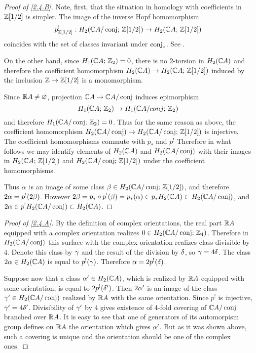 \documentclass{article}
\numberwithin{equation}{section}
\begin{document}
\begin{proof}[Proof of \ref{2.4.B}] Note, first, that the situation in homology
with coefficients in $\mathbb Z[1/2]$ is simpler. The image of the
inverse Hopf homomorphism
$$
p^!_{\mathbb Z[1/2]}:H_2(\mathbb C A/\operatorname{conj};\,\mathbb Z[1/2])\to H_2(\mathbb C A;\,\mathbb Z[1/2])
$$
coincides with the set of classes invariant under $\operatorname{conj}_*$. See
\cite{Br}.

On the other hand, since $H_1(\mathbb C A;\,\mathbb Z_2)=0$, there is no 2-torsion in
$H_2(\mathbb C A)$ and therefore the coefficient homomorphism $H_2(\mathbb C A)\to
H_2(\mathbb C A;\,\mathbb Z[1/2])$ induced by the inclusion $\mathbb Z\to\mathbb Z[1/2]$ is
a monomorphism.

Since $\mathbb R A\ne \varnothing$, projection $\mathbb C A\to\mathbb C A/\operatorname{conj}$
induces epimorphism
$$H_1(\mathbb C A;\,\mathbb Z_2)\to H_1(\mathbb C A/conj;\,\mathbb Z_2)$$
and therefore $H_1(\mathbb C A/\operatorname{conj};\,\mathbb Z_2)=0$. Thus for the same reason as
above, the coefficient homomorphism $H_2(\mathbb C A/\operatorname{conj})\to
H_2(\mathbb C A/\operatorname{conj};\,\mathbb Z[1/2])$ is injective. The coefficient
homomorphisms commute with $p_*$ and $p^!$ Therefore in what follows we
may identify elements of $H_2(\mathbb C A)$ and $H_2(\mathbb C A/\operatorname{conj})$ with their
images in $H_2(\mathbb C A;\,\mathbb Z[1/2])$ and $H_2(\mathbb C A/\operatorname{conj};\,\mathbb Z[1/2])$ under the
coefficient homomorphisms.

Thus $\alpha$ is an image of some class $\beta\in
H_2(\mathbb C A/\operatorname{conj};\,\mathbb Z[1/2])$, and therefore $2\alpha=p^!(2\beta)$. However
$2\beta=p_*\circ p^!(\beta)=p_*(\alpha)\in p_*H_2(\mathbb C A)\subset
H_2(\mathbb C A/\operatorname{conj})$, and $2\alpha\in p^!H_2(\mathbb C A/\operatorname{conj})\subset H_2(\mathbb C A)$. 
\end{proof}

\begin{proof}[Proof of \ref{2.4.A}] By the definition
of complex orientations, the real part $\mathbb R A$ equipped with a complex
orientation realizes $0\in H_2(\mathbb C A/\operatorname{conj};\,\mathbb Z_4)$. Therefore in
$H_2(\mathbb C A/\operatorname{conj})$ this surface with the complex orientation realizes
class divisible by 4. Denote this class by $\gamma$ and the result of
the division by $\delta$, so $\gamma =4\delta$. The class $2\alpha\in H_2(\mathbb C A)$
is equal to $p^!(\gamma)$. Therefore $\alpha=2p^!(\delta)$.

Suppose now that a class $\alpha'\in H_2(\mathbb C A)$, which is realized by $\mathbb R A$
equipped with some orientation, is equal to $2p^!(\delta')$. Then
$2\alpha'$ is an image of the class $\gamma'\in H_2(\mathbb C A/\operatorname{conj})$ realized
by $\mathbb R A$ with the same orientation. Since $p^!$ is injective,
$\gamma'=4\delta'$. Divisibility of $\gamma'$ by 4 gives existence of 4-fold
covering of $\mathbb C A/\operatorname{conj}$ branched over $\mathbb R A$. It is easy to see that
one of generators of its automorpism group defines on $\mathbb R A$ the
orientation which gives $\alpha'$. But as it was shown above, such a
covering is unique and the orientation should be one of the complex
ones. %
\end{proof}
\end{document}
